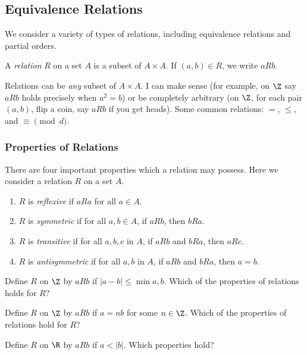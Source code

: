 


\subsection{Equivalence Relations}

We consider a variety of types of relations, including equivalence relations and partial orders.

\begin{definition}
 A {\em relation} $R$ on a set $A$ is a subset of $A \times A$.  If $(a,b) \in R$, we write $aRb$.
\end{definition}

Relations can be {\em any} subset of $A \times A$.  I can make sense (for example, on $\Z$ say $aRb$ holds precisely when $a^2 = b$) or be completely arbitrary (on $\Z$, for each pair $(a,b)$, flip a coin, say $aRb$ if you get heads).  Some common relations: $=$, $\le$, and $\equiv \pmod d$.

\subsubsection*{Properties of Relations}

There are four important properties which a relation may possess.  Here we consider a relation $R$ on a set $A$.
\begin{enumerate}
 \item $R$ is {\em reflexive} if $aRa$ for all $a \in A$.
 \item $R$ is {\em symmetric} if for all $a, b \in A$, if $aRb$, then $bRa$.
 \item $R$ is {\em transitive} if for all $a, b, c$ in $A$, if $aRb$ and $bRa$, then $aRc$.
 \item $R$ is {\em antisymmetric} if for all $a, b$ in $A$, if $aRb$ and $bRa$, then $a=b$.
\end{enumerate}

\begin{example}
 Define $R$ on $\Z$ by $aRb$ if $|a-b| \le \min{a,b}$.  Which of the properties of relations holds for $R$?
 
 Define $R$ on $\Z$ by $aRb$ if $a = nb$ for some $n \in \Z$. Which of the properties of relations hold for $R$?
 
 Define $R$ on $\R$ by $aRb$ if $a < |b|$. Which properties hold?
\end{example}

